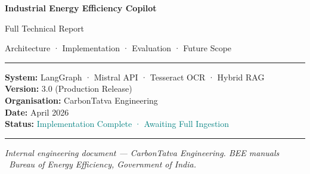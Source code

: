 \documentclass[12pt,a4paper]{report}
\begin{document}

\begin{titlepage}
\centering
\vspace*{1.8cm}

{\Huge\bfseries Industrial Energy Efficiency Copilot\par}
\vspace{0.6cm}
{\LARGE Full Technical Report\par}
\vspace{0.3cm}
{\large\color{gray}Architecture · Implementation · Evaluation · Future Scope\par}

\vspace{1.2cm}
\noindent\rule{0.85\textwidth}{1.2pt}
\vspace{0.5cm}

{\large
\textbf{System:} LangGraph · Mistral API · Tesseract OCR · Hybrid RAG \\[0.3em]
\textbf{Version:} 3.0 (Production Release) \\[0.3em]
\textbf{Organisation:} CarbonTatva Engineering \\[0.3em]
\textbf{Date:} April 2026 \\[0.3em]
\textbf{Status:} \textcolor{teal}{Implementation Complete · Awaiting Full Ingestion}
}

\vspace{1.2cm}
\noindent\rule{0.85\textwidth}{0.4pt}

\vspace{0.8cm}

\begin{abstract}
\noindent
This document is the complete technical reference for the Industrial Energy Efficiency Copilot---a production-grade, agentic Retrieval-Augmented Generation (RAG) system grounded exclusively in the Bureau of Energy Efficiency (BEE) Thermal and Electrical Utilities manuals. The report covers the full engineering stack: Tesseract-based OCR ingestion, LangGraph orchestration with parallel retrieval, Mistral API cloud inference, Server-Sent Events (SSE) streaming, a streaming Next.js frontend, and a comprehensive automated evaluation framework. The system is designed for high performance with cloud-based inference and public deployment capability. The document also presents a structured fine-tuning strategy as future scope, positioned strictly as a last-resort optimisation after retrieval and prompt improvements have been exhausted.
\end{abstract}

\vfill
{\small\itshape Internal engineering document --- CarbonTatva Engineering. BEE manuals \textcopyright\ Bureau of Energy Efficiency, Government of India.}
\end{titlepage}
\end{document}
